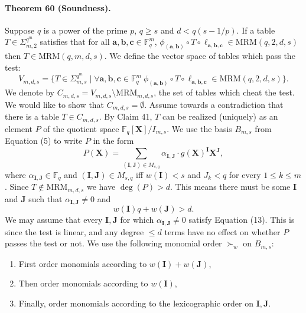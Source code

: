 \documentclass[10pt,a4paper]{article}
\begin{document}
\paragraph{Theorem 60 (Soundness).} Suppose $q$ is a power of the prime $p$, $q\geq s$ and $d<q(s-1/p)$. If a table $T\in\Sigma_{m,2}^{q^m}$ satisfies that for all $\boldsymbol a,\boldsymbol b,\boldsymbol c\in\mathbb F_q^m$, $\phi_{(\boldsymbol a,\boldsymbol b)}\circ T\circ\ell_{\boldsymbol a,\boldsymbol b,\boldsymbol c}\in\mathrm{MRM}(q,2,d,s)$ then $T\in\mathrm{MRM}(q,m,d,s)$.
We define the vector space of tables which pass the test:
\[V_{m,d,s}=\{T\in\Sigma_{m,s}^{q^m}\mid\forall\boldsymbol a,\boldsymbol b,\boldsymbol c\in\mathbb F_q^m\ \phi_{(\boldsymbol a,\boldsymbol b)}\circ T\circ\ell_{\boldsymbol a,\boldsymbol b,\boldsymbol c}\in\mathrm{MRM}(q,2,d,s)\}.\tag{12}\]
We denote by $C_{m,d,s}=V_{m,d,s}\setminus\mathrm{MRM}_{m,d,s}$, the set of tables which cheat the test. We would like to show that $C_{m,d,s}=\emptyset$. Assume towards a contradiction that there is a table $T\in C_{m,d,s}$. By Claim 41, $T$ can be realized (uniquely) as an element $P$ of the quotient space $\mathbb F_q[\boldsymbol X]/I_{m,s}$. We use the basis $B_{m,s}$ from Equation (5) to write $P$ in the form
\[P(\boldsymbol X)=\sum_{(\boldsymbol I,\boldsymbol J)\in M_{s,q}}\alpha_{\boldsymbol I,\boldsymbol J}\cdot g(\boldsymbol X)^{\boldsymbol I}\boldsymbol X^{\boldsymbol J},\]
where $\alpha_{\boldsymbol I,\boldsymbol J}\in\mathbb F_q$ and $(\boldsymbol I,\boldsymbol J)\in M_{s,q}$ iff $w(\boldsymbol I)<s$ and $J_k<q$ for every $1\leq k\leq m$. Since $T\notin\mathrm{MRM}_{m,d,s}$ we have $\deg(P)>d$. This means there must be some $\boldsymbol I$ and $\boldsymbol J$ such that $\alpha_{\boldsymbol I,\boldsymbol J}\neq0$ and
\[w(\boldsymbol I)q+w(\boldsymbol J)>d.\tag{13}\]
We may assume that every $\boldsymbol I,\boldsymbol J$ for which $\alpha_{\boldsymbol I,\boldsymbol J}\neq0$ satisfy Equation (13). This is since the test is linear, and any degree $\leq d$ terms have no effect on whether $P$ passes the test or not.
We use the following monomial order $\succ_w$ on $B_{m,s}$:
\begin{enumerate}
\item First order monomials according to $w(\boldsymbol I)+w(\boldsymbol J)$,
\item Then order monomials according to $w(\boldsymbol I)$,
\item Finally, order monomials according to the lexicographic order on $\boldsymbol I,\boldsymbol J$.
\end{enumerate}
\end{document}
